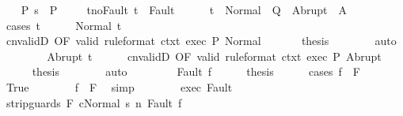 \begin{isabellebody}
\ \ \isamarkupfalse%
\ P{\isacharcolon}\ {\isachardoublequoteopen}s\ {\isasymin}\ P{\isachardoublequoteclose}\ \isanewline
\ \ \isamarkupfalse%
\ t{\isacharunderscore}noFault{\isacharcolon}\ {\isachardoublequoteopen}t\ {\isasymnotin}\ Fault\ {\isacharbackquote}\ {\isacharbraceleft}{\isacharbraceright}{\isachardoublequoteclose}\isanewline
\ \ \isamarkupfalse%
\ {\isachardoublequoteopen}t\ {\isasymin}\ Normal\ {\isacharbackquote}\ Q\ {\isasymunion}\ Abrupt\ {\isacharbackquote}\ A{\isachardoublequoteclose}\isanewline
\ \ \isamarkupfalse%
\ {\isacharparenleft}cases\ t{\isacharparenright}\isanewline
\ \ \ \ \isamarkupfalse%
\ {\isacharparenleft}Normal\ t{\isacharprime}{\isacharparenright}\isanewline
\ \ \ \ \isamarkupfalse%
\ cnvalidD\ {\isacharbrackleft}OF\ valid\ {\isacharbrackleft}rule{\isacharunderscore}format{\isacharbrackright}\ ctxt{\isacharprime}\ exec\ P{\isacharbrackright}\ Normal\ \isanewline
\ \ \ \ \isamarkupfalse%
\ {\isacharquery}thesis\isanewline
\ \ \ \ \ \ \isamarkupfalse%
\ auto\isanewline
\ \ \isamarkupfalse%
\isanewline
\ \ \ \ \isamarkupfalse%
\ {\isacharparenleft}Abrupt\ t{\isacharprime}{\isacharparenright}\isanewline
\ \ \ \ \isamarkupfalse%
\ cnvalidD\ {\isacharbrackleft}OF\ valid\ {\isacharbrackleft}rule{\isacharunderscore}format{\isacharbrackright}\ ctxt{\isacharprime}\ exec\ P{\isacharbrackright}\ Abrupt\ \isanewline
\ \ \ \ \isamarkupfalse%
\ {\isacharquery}thesis\isanewline
\ \ \ \ \ \ \isamarkupfalse%
\ auto\isanewline
\ \ \isamarkupfalse%
\isanewline
\ \ \ \ \isamarkupfalse%
\ {\isacharparenleft}Fault\ f{\isacharparenright}\isanewline
\ \ \ \ \isamarkupfalse%
\ {\isacharquery}thesis\isanewline
\ \ \ \ \isamarkupfalse%
\ {\isacharparenleft}cases\ {\isachardoublequoteopen}f\ {\isasymin}\ F{\isachardoublequoteclose}{\isacharparenright}\isanewline
\ \ \ \ \ \ \isamarkupfalse%
\ True\isanewline
\ \ \ \ \ \ \isamarkupfalse%
\ {\isachardoublequoteopen}f\ {\isasymnotin}\ {\isacharminus}F{\isachardoublequoteclose}\ \isamarkupfalse%
\ simp\isanewline
\ \ \ \ \ \ \isamarkupfalse%
\ exec\ Fault\isanewline
\ \ \ \ \ \ \isamarkupfalse%
\ {\isachardoublequoteopen}{\isasymGamma}{\isasymturnstile}{\isasymlangle}strip{\isacharunderscore}guards\ {\isacharparenleft}{\isacharminus}F{\isacharparenright}\ c{\isacharcomma}Normal\ s{\isasymrangle}\ {\isacharequal}n{\isasymRightarrow}\ Fault\ f{\isachardoublequoteclose}\ \isanewline

\end{isabellebody}
